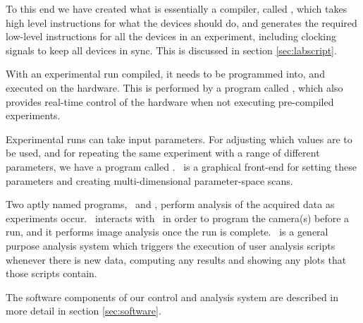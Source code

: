 To this end we have created what is essentially a compiler, called \labscript, which takes high level instructions for what the devices should do, and generates the required low-level instructions for all the devices in an experiment, including clocking signals to keep all devices in sync. This is discussed in section \ref{sec:labscript}.

With an experimental run compiled, it needs to be programmed into, and executed on the hardware. This is performed by a program called \blacs, which also provides real-time control of the hardware when not executing pre-compiled experiments.

Experimental runs can take input parameters. For adjusting which values are to be used, and for repeating the same experiment with a range of different parameters, we have a program called \runmanager. \runmanager\ is a graphical front-end for setting these parameters and creating multi-dimensional parameter-space scans.

Two aptly named programs, \lyse\ and \bias, perform analysis of the acquired data as experiments occur. \bias\ interacts with \blacs\ in order to program the camera(s) before a run, and it performs image analysis once the run is complete. \lyse\ is a general purpose analysis system which triggers the execution of user analysis scripts whenever there is new data, computing any results and showing any plots that those scripts contain.

The software components of our control and analysis system are described in more detail in section \ref{sec:software}.
